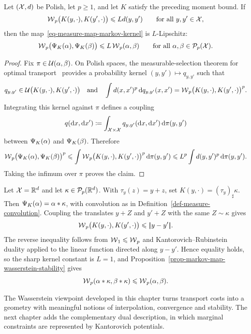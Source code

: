 \begin{prop}\label{prop-markov-map-wasserstein-stability}
	Let $(\mathcal{X},d)$ be Polish, let $p\geq1$, and let $K$ satisfy the preceding moment bound. If
	\[
		\operatorname{\mathcal{W}}_p\bigl(K(y,\cdot),K(y',\cdot)\bigr)
		\leqslant Ld(y,y')
		\qquad\text{for all }y,y'\in\mathcal{X},
	\]
	then the map~\eqref{eq-measure-map-markov-kernel} is $L$-Lipschitz:
	\[
		\operatorname{\mathcal{W}}_p\bigl(\Psi_K(\alpha),\Psi_K(\beta)\bigr)
		\leqslant L\operatorname{\mathcal{W}}_p(\alpha,\beta)
		\qquad\text{for all }\alpha,\beta\in\mathcal{P}_p(\mathcal{X}).
	\]
\end{prop}
\begin{proof}
	Fix $\pi\in\mathcal{U}(\alpha,\beta)$. On Polish spaces, the measurable-selection theorem for optimal transport~\cite{Villani09} provides a probability kernel $(y,y')\mapsto q_{y,y'}$ such that
	\[
		q_{y,y'}\in\mathcal{U}\bigl(K(y,\cdot),K(y',\cdot)\bigr)
		\quad \text{and} \quad
		\int d(x,x')^p\,\mathrm{d} q_{y,y'}(x,x')
		=
		\operatorname{\mathcal{W}}_p\bigl(K(y,\cdot),K(y',\cdot)\bigr)^p.
	\]
	Integrating this kernel against $\pi$ defines a coupling
	\[
		q(\mathrm{d} x,\mathrm{d} x')
		\coloneqq
		\int_{\mathcal{X}\times\mathcal{X}}
		q_{y,y'}(\mathrm{d} x,\mathrm{d} x')\,\mathrm{d}\pi(y,y')
	\]
	between $\Psi_K(\alpha)$ and $\Psi_K(\beta)$. Therefore
	\[
		\operatorname{\mathcal{W}}_p\bigl(\Psi_K(\alpha),\Psi_K(\beta)\bigr)^p
		\leqslant
		\int\operatorname{\mathcal{W}}_p\bigl(K(y,\cdot),K(y',\cdot)\bigr)^p\,\mathrm{d}\pi(y,y')
		\leqslant
		L^p\int d(y,y')^p\,\mathrm{d}\pi(y,y').
	\]
	Taking the infimum over $\pi$ proves the claim.
\end{proof}

\begin{example}\label{ex-convolution-wasserstein-nonexpansive}
	Let $\mathcal{X}=\mathbb{R}^d$ and let $\kappa\in\mathcal{P}_p(\mathbb{R}^d)$. With $\tau_y(z)=y+z$, set $K(y,\cdot)=(\tau_y)_\sharp\kappa$. Then $\Psi_K(\alpha)=\alpha*\kappa$, with convolution as in Definition~\ref{def-measure-convolution}. Coupling the translates $y+Z$ and $y'+Z$ with the same $Z\sim\kappa$ gives
	\[
		\operatorname{\mathcal{W}}_p\bigl(K(y,\cdot),K(y',\cdot)\bigr)
		\leqslant|\!| y-y' |\!|.
	\]
	The reverse inequality follows from $\operatorname{\mathcal{W}}_1\leqslant\operatorname{\mathcal{W}}_p$ and Kantorovich--Rubinstein duality applied to the linear function directed along $y-y'$. Hence equality holds, so the sharp kernel constant is $L=1$, and Proposition~\ref{prop-markov-map-wasserstein-stability} gives
	\[
		\operatorname{\mathcal{W}}_p(\alpha*\kappa,\beta*\kappa)\leqslant\operatorname{\mathcal{W}}_p(\alpha,\beta).
	\]
\end{example}


The Wasserstein viewpoint developed in this chapter turns transport costs into a geometry with meaningful notions of interpolation, convergence and stability. The next chapter adds the complementary dual description, in which marginal constraints are represented by Kantorovich potentials.
